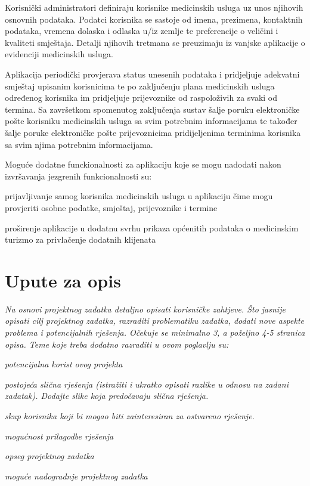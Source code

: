		Korisnički administratori definiraju korisnike medicinskih usluga uz unos njihovih osnovnih podataka. Podatci korisnika se sastoje od imena, prezimena, kontaktnih podataka, vremena dolaska i odlaska u/iz zemlje te preferencije o veličini i kvaliteti smještaja. Detalji njihovih tretmana se preuzimaju iz vanjske aplikacije o evidenciji medicinskih usluga.

		\break
		Aplikacija periodički provjerava status unesenih podataka i pridjeljuje adekvatni smještaj upisanim korisnicima te po zaključenju plana medicinskih usluga određenog korisnika im pridjeljuje prijevoznike od raspoloživih za svaki od termina. Sa završetkom spomenutog zaključenja sustav šalje poruku elektroničke pošte korisniku medicinskih usluga sa svim potrebnim informacijama te također šalje poruke elektroničke pošte prijevoznicima pridijeljenima terminima korisnika sa svim njima potrebnim informacijama.
		
		\medskip
		Moguće dodatne funckionalnosti za aplikaciju koje se mogu nadodati nakon izvršavanja jezgrenih funkcionalnosti su:
		\begin{packed_item}
			\item  prijavljivanje samog korisnika medicinskih usluga u aplikaciju čime mogu provjeriti osobne podatke, smještaj, prijevoznike i termine
			\item  proširenje aplikacije u dodatnu svrhu prikaza općenitih podataka o medicinskim turizmo za privlačenje dodatnih klijenata
		\end{packed_item}
		\break
		
		
		
		\section{Upute za opis}
		\textit{Na osnovi projektnog zadatka detaljno opisati korisničke zahtjeve. Što jasnije opisati cilj projektnog zadatka, razraditi problematiku zadatka, dodati nove aspekte problema i potencijalnih rješenja. Očekuje se minimalno 3, a poželjno 4-5 stranica opisa.	Teme koje treba dodatno razraditi u ovom poglavlju su:}
		\begin{packed_item}
			\item \textit{potencijalna korist ovog projekta}
			\item \textit{postojeća slična rješenja (istražiti i ukratko opisati razlike u odnosu na zadani zadatak). Dodajte slike koja predočavaju slična rješenja.}
			\item \textit{skup korisnika koji bi mogao biti zainteresiran za ostvareno rješenje.}
			\item \textit{mogućnost prilagodbe rješenja }
			\item \textit{opseg projektnog zadatka}
			\item \textit{moguće nadogradnje projektnog zadatka}
		\end{packed_item}
		

